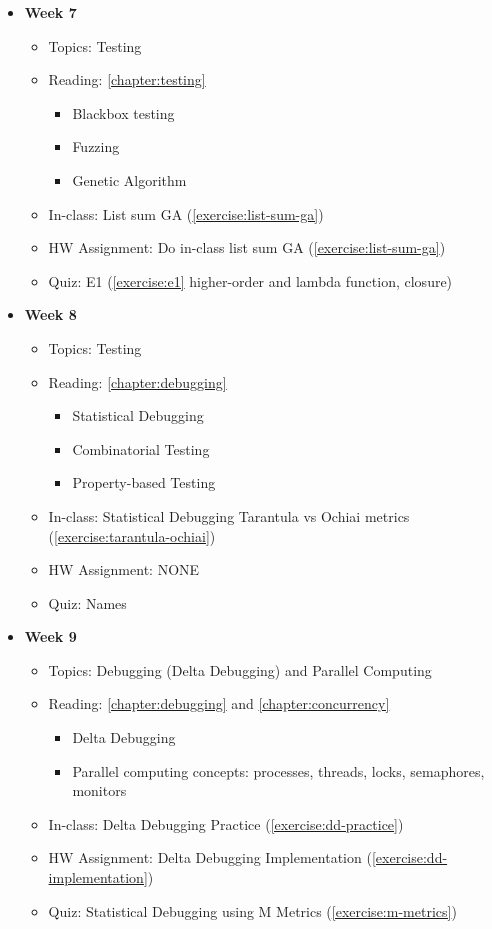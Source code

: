 \documentclass[oneside,11pt,dvipsnames]{book}
\begin{document}
\begin{itemize}
    \item \textbf{Week 7}
    \begin{itemize}
        \item Topics: Testing
        \item Reading: \autoref{chapter:testing}
        \begin{itemize}
            \item Blackbox testing
            \item Fuzzing
            \item Genetic Algorithm
        \end{itemize}
        \item In-class: List sum GA (\autoref{exercise:list-sum-ga})
        \item HW Assignment: Do in-class list sum GA (\autoref{exercise:list-sum-ga})
        \item Quiz: E1 (\autoref{exercise:e1} higher-order and lambda function, closure)
    \end{itemize}

    \item \textbf{Week 8}
    \begin{itemize}
        \item Topics: Testing
        \item Reading: \autoref{chapter:debugging}
        \begin{itemize}
            \item Statistical Debugging
            \item Combinatorial Testing
            \item Property-based Testing
        \end{itemize}
        \item In-class: Statistical Debugging Tarantula vs Ochiai metrics (\autoref{exercise:tarantula-ochiai})
        \item HW Assignment: NONE
        \item Quiz: Names
    \end{itemize}

    \item \textbf{Week 9}
    \begin{itemize}
        \item Topics: Debugging (Delta Debugging) and Parallel Computing
        \item Reading: \autoref{chapter:debugging} and \autoref{chapter:concurrency}
        \begin{itemize}
            \item Delta Debugging
            \item Parallel computing concepts: processes, threads, locks, semaphores, monitors
        \end{itemize}
        \item In-class: Delta Debugging Practice (\autoref{exercise:dd-practice})
        \item HW Assignment: Delta Debugging Implementation (\autoref{exercise:dd-implementation})
        \item Quiz: Statistical Debugging using M Metrics (\autoref{exercise:m-metrics})
    \end{itemize}


\end{itemize}
\end{document}
